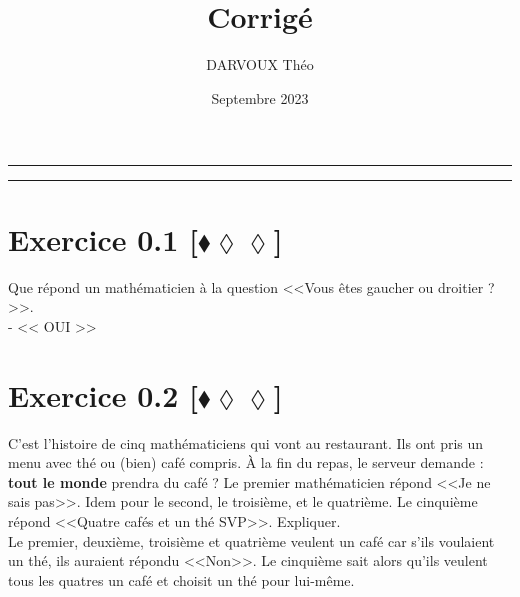 \documentclass[10pt]{article}
\title{\bf{\pagetitle}\\\large{Corrigé}}
\date{Septembre 2023}
\author{DARVOUX Théo}
\def\pagetitle{Logique}
\begin{document}
\renewcommand*\contentsname{Exercices.}
\renewcommand*{\cftsecleader}{\cftdotfill{\cftdotsep}}
\maketitle
\hrule
\tableofcontents
\vspace{0.5cm}
\hrule

\thispagestyle{fancy}
\fancyhead[C]{\pagetitle}



\section*{Exercice 0.1 [$\blacklozenge\lozenge\lozenge$]}
\begin{tcolorbox}[enhanced, width=7in, center, size=fbox, fontupper=\large, drop shadow southwest]
    Que répond un mathématicien à la question <<Vous êtes gaucher ou droitier ?>>.\\
    - << OUI >>
\end{tcolorbox}

\section*{Exercice 0.2 [$\blacklozenge\lozenge\lozenge$]}
\begin{tcolorbox}[enhanced, width=7in, center, size=fbox, fontupper=\large, drop shadow southwest]
    C'est l'histoire de cinq mathématiciens qui vont au restaurant. Ils ont pris un menu avec thé ou (bien) café compris. À la fin du repas, le serveur demande : \textbf{tout le monde} prendra du café ? Le premier mathématicien répond <<Je ne sais pas>>. Idem pour le second, le troisième, et le quatrième. Le cinquième répond <<Quatre cafés et un thé SVP>>. Expliquer.\\[0.5cm]
    Le premier, deuxième, troisième et quatrième veulent un café car s'ils voulaient un thé, ils auraient répondu <<Non>>. Le cinquième sait alors qu'ils veulent tous les quatres un café et choisit un thé pour lui-même. 
\end{tcolorbox}
\end{document}
